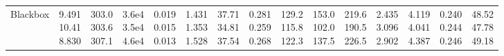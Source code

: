 \begin{landscape}
\begin{table}[t]
{\begin{tabular}{@{}lrrrrrrrrrrrrrr@{}}
Blackbox & \makecell[r]{9.491\\10.41\\8.830} & \makecell[r]{303.0\\303.6\\307.1} & \makecell[r]{3.6e4\\3.5e4\\4.6e4} & \makecell[r]{0.019\\0.015\\0.013} & \makecell[r]{1.431\\1.353\\1.528} & \makecell[r]{37.71\\34.81\\37.54} & \makecell[r]{0.281\\0.259\\0.268} & \makecell[r]{129.2\\115.8\\122.3} & \makecell[r]{153.0\\102.0\\137.5} & \makecell[r]{219.6\\190.5\\226.5} & \makecell[r]{2.435\\3.096\\2.902} & \makecell[r]{4.119\\4.041\\4.387} & \makecell[r]{0.240\\0.244\\0.246} & \makecell[r]{48.52\\47.78\\49.18} \\

\end{tabular}}
\end{table}
\end{landscape}
